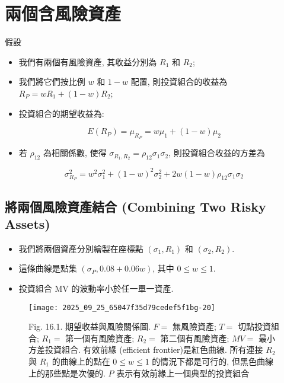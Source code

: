 \documentclass[letterpaper]{article}
\begin{document}
		\section{兩個含風險資產}
		假設  
		
		\begin{itemize}
			\item 我們有兩個有風險資產, 其收益分別為 $R_{1}$ 和 $R_{2}$;  
			\item 我們將它們按比例 $w$ 和 $1-w$ 配置, 則投資組合的收益為 $R_{P}=w R_{1}+ (1-w) R_{2}$;  
			\item 投資組合的期望收益為: 
		\end{itemize}
		
		
		$$
		E\left (R_{P}\right)=\mu_{R_{P}}=w \mu_{1}+ (1-w) \mu_{2}
		$$
		
		\begin{itemize}
			\item 若 $\rho_{12}$ 為相關係數, 使得 $\sigma_{R_{1}, R_{2}}=\rho_{12} \sigma_{1} \sigma_{2}$, 則投資組合收益的方差為  
		\end{itemize}
		
		$$
		\sigma_{R_{P}}^{2}=w^{2} \sigma_{1}^{2}+ (1-w)^{2} \sigma_{2}^{2}+2 w (1-w) \rho_{12} \sigma_{1} \sigma_{2}
		$$
		
		\subsection{將兩個風險資產結合 (Combining Two Risky Assets)}
		\begin{itemize}
			\item 我們將兩個資產分別繪製在座標點 $ (\sigma_{1}, R_{1})$ 和 $ (\sigma_{2}, R_{2})$.   
			\item 這條曲線是點集 $ (\sigma_{P}, 0.08+0.06w)$, 其中 $0 \leq w \leq 1$.   
			\item 投資組合 MV 的波動率小於任一單一資產.   
		\end{itemize}
		
		\begin{figure}[h]
			\begin{center}
				\texttt{[image: 2025\_09\_25\_65047f35d79cedef5f1bg-20]}
				\caption{Fig. 16.1. 期望收益與風險關係圖.   
					$F=$ 無風險資產;  
					$T=$ 切點投資組合;  
					$R_{1}=$ 第一個有風險資產;
					$R_{2}=$ 第二個有風險資產;  
					$MV=$ 最小方差投資組合.   
					有效前緣 (efficient frontier)是紅色曲線.   
					所有連接 $R_{2}$ 與 $R_{1}$ 的曲線上的點在 $0 \leq w \leq 1$ 的情況下都是可行的, 但黑色曲線上的那些點是次優的.   
					$P$ 表示有效前緣上一個典型的投資組合}
			\end{center}
		\end{figure}
		
\end{document}
